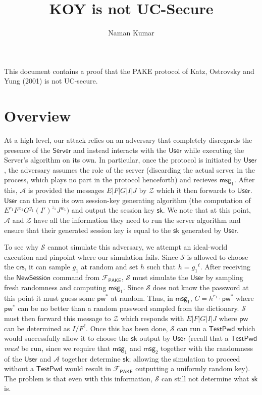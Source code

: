 \documentclass[12pt,a4paper]{article}
\title{\textbf{KOY is not UC-Secure}}
\author{Naman Kumar}
\newcommand{\simulator}{\mathcal{S}}
\newcommand{\env}{\mathcal{Z}}
\newcommand{\adv}{\mathcal{A}}
\newcommand{\pake}{\mathcal{F}_{\mathsf{PAKE}}}
\newcommand{\user}{\mathsf{User}}
\newcommand{\sk}{\mathsf{sk}}
\newcommand{\pw}{\mathsf{pw}}
\newcommand{\crs}{\mathsf{crs}}
\newcommand{\newsession}{\mathsf{NewSession}}
\newcommand{\testpwd}{\mathsf{TestPwd}}
\newcommand{\server}{\mathsf{Server}}
\newcommand{\msg}[1]{\mathsf{msg}_{#1}}
\begin{document}
	\maketitle
	
	This document contains a proof that the PAKE protocol of Katz, Ostrovsky and Yung (2001) is not UC-secure.
	
	\section{Overview}
	
	At a high level, our attack relies on an adversary that completely disregards the presence of the $\server$ and instead interacts with the $\user$ while executing the Server's algorithm on its own. In particular, once the protocol is initiated by $\user$, the adversary assumes the role of the server (discarding the actual server in the process, which plays no part in the protocol henceforth) and recieves $\msg{1}$. After this, $\adv$ is provided the messages $E|F|G|I|J$ by $\env$ which it then forwards to $\user$. $\user$ can then run its own session-key generating algorithm (the computation of $E^{r_1}F^{x_1}G^{y_1}(I')^{z_1}J^{w_1})$ and output the session key $\sk$. We note that at this point, $\adv$ and $\env$ have all the information they need to run the server algorithm and ensure that their generated session key is equal to the $\sk$ generated by $\user$.
	
	To see why $\simulator$ cannot simulate this adversary, we attempt an ideal-world execution and pinpoint where our simulation fails. Since $\simulator$ is allowed to choose the $\crs$, it can sample $g_1$ at random and set $h$ such that $h={g_1}^{\ell}$. After receiving the $\newsession$ command from $\pake$, $\simulator$ must simulate the $\user$ by sampling fresh randomness and computing $\msg{1}$. Since $\simulator$ does not know the password at this point it must guess some $\pw^{*}$ at random. Thus, in $\msg{1}$, $C=h^{r_1}\cdot\pw^{*}$ where $\pw^{*}$ can be no better than a random password sampled from the dictionary. $\simulator$ must then forward this message to $\env$ which responds with $E|F|G|I|J$ where  $\pw$ can be determined as $I/F^\ell$. Once this has been done, $\simulator$ can run a $\testpwd$ which would successfully allow it to choose the $\sk$ output by $\user$ (recall that a $\testpwd$ \textit{must} be run, since we require that $\msg{1}$ and $\msg{2}$ together with the randomness of the $\user$ and $\adv$ together determine $\sk$; allowing the simulation to proceed without a $\testpwd$ would result in $\pake$ outputting a uniformly random key). The problem is that even with this information, $\simulator$ can still not determine what $\sk$ is.
	
\end{document}
